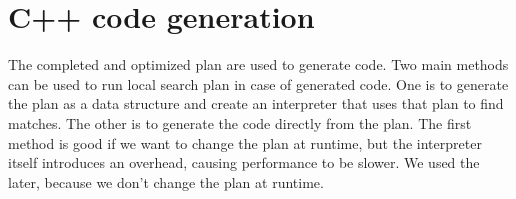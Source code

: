 \section{C++ code generation}

The completed and optimized plan are used to generate \cpp{} code. Two main methods can be used to run local search plan in case of generated code. One is to generate the plan as a data structure and create an interpreter that uses that plan to find matches. The other is to generate the code directly from the plan. The first method is good if we want to change the plan at runtime, but the interpreter itself introduces an overhead, causing performance to be slower. We used the later, because we don't change the plan at runtime.












